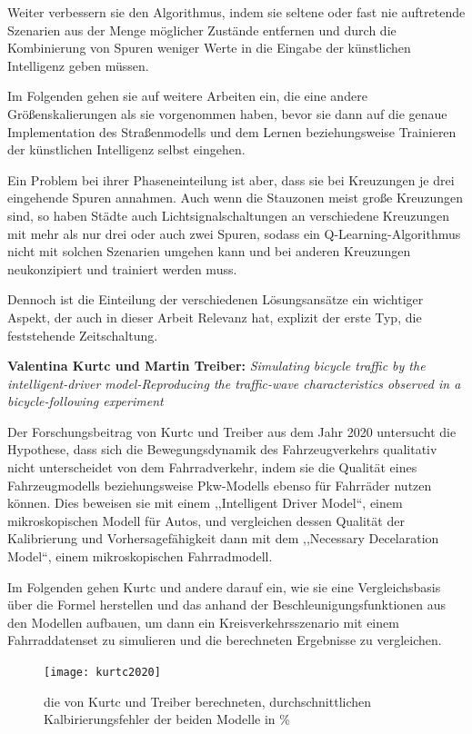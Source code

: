 Weiter verbessern sie den Algorithmus, indem sie seltene oder fast nie auftretende Szenarien aus der Menge möglicher Zustände entfernen und durch die Kombinierung von Spuren weniger Werte in die Eingabe der künstlichen Intelligenz geben müssen.

Im Folgenden gehen sie auf weitere Arbeiten ein, die eine andere Größenskalierungen als sie vorgenommen haben, bevor sie dann auf die genaue Implementation des Straßenmodells und dem Lernen beziehungsweise Trainieren der künstlichen Intelligenz selbst eingehen.

Ein Problem bei ihrer Phaseneinteilung ist aber, dass sie bei Kreuzungen je drei eingehende Spuren annahmen.
Auch wenn die Stauzonen meist große Kreuzungen sind, so haben Städte auch Lichtsignalschaltungen an verschiedene Kreuzungen mit mehr als nur drei oder auch zwei Spuren, sodass ein Q-Learning-Algorithmus nicht mit solchen Szenarien umgehen kann und bei anderen Kreuzungen neukonzipiert und trainiert werden muss.

Dennoch ist die Einteilung der verschiedenen Lösungsansätze ein wichtiger Aspekt, der auch in dieser Arbeit Relevanz hat, explizit der erste Typ, die feststehende Zeitschaltung.


\textbf{Valentina Kurtc und Martin Treiber:}
\textit{Simulating bicycle traffic by the intelligent-driver model-Reproducing the traffic-wave characteristics observed in a bicycle-following experiment}

Der Forschungsbeitrag von Kurtc und Treiber aus dem Jahr 2020 untersucht die Hypothese, dass sich die Bewegungsdynamik des Fahrzeugverkehrs qualitativ nicht unterscheidet von dem Fahrradverkehr, indem sie die Qualität eines Fahrzeugmodells beziehungsweise Pkw-Modells ebenso für Fahrräder nutzen können.
Dies beweisen sie mit einem ,,Intelligent Driver Model``\cite{Kurtc2020}, einem mikroskopischen Modell für Autos, und vergleichen dessen Qualität der Kalibrierung und Vorhersagefähigkeit dann mit dem ,,Necessary Decelaration Model``\cite{Kurtc2020}, einem mikroskopischen Fahrradmodell.

Im Folgenden gehen Kurtc und andere darauf ein, wie sie eine Vergleichsbasis über die Formel herstellen und das anhand der Beschleunigungsfunktionen aus den Modellen aufbauen, um dann ein Kreisverkehrsszenario mit einem Fahrraddatenset zu simulieren und die berechneten Ergebnisse zu vergleichen.

\begin{figure}[h]
    \centering
    \texttt{[image: kurtc2020]}~\caption{die von Kurtc und Treiber berechneten, durchschnittlichen Kalbirierungsfehler der beiden Modelle in \%~\cite{Kurtc2020}}
    \label{fig:kurtc2020}
\end{figure}

